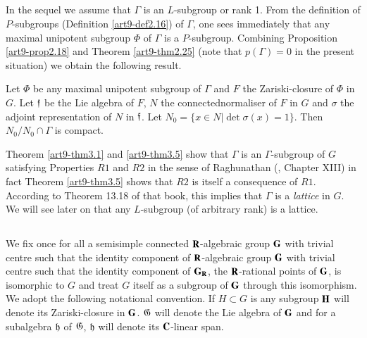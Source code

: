 \subsection{}\label{art9-subsec3.4}
In the sequel we assume that $\Gamma$ is an $L$-subgroup or rank 1. From the definition of $P$-subgroups (Definition \ref{art9-def2.16}) of $\Gamma$, one sees immediately that any maximal unipotent subgroup $\Phi$ of $\Gamma$ is a $P$-subgroup. Combining Proposition \ref{art9-prop2.18} and Theorem \ref{art9-thm2.25} (note that $p(\Gamma) = 0$ in the present situation) we obtain the following result.

\setcounter{definition}{4}
\begin{theorem}\label{art9-thm3.5}
Let $\Phi$ be any maximal unipotent subgroup of $\Gamma$ and $F$ the Zariski-closure of $\Phi$ in $G$. Let $\mathfrak{f}$ be the Lie algebra of $F$, $N$ the connected\pageoriginale normaliser of $F$ in $G$ and $\sigma$ the adjoint representation of $N$ in $\mathfrak{f}$. Let $N_0 = \{x \in N \big| \det \sigma (x) =1\}$. Then $N_0 / N_0 \cap \Gamma$ is compact.
\end{theorem}

\begin{remark}\label{art9-remark3.6}
Theorem \ref{art9-thm3.1} and \ref{art9-thm3.5} show that $\Gamma$ is an $\Gamma$-subgroup of $G$ satisfying Properties $R1$ and $R2$ in the sense of Raghunathan (\cite{art9-raghunathan-1}, Chapter XIII) in fact Theorem \ref{art9-thm3.5} shows that $R2$ is itself a consequence of $R1$. According to Theorem 13.18 of that book, this implies that $\Gamma$ is a \textit{lattice} in $G$. We will see later on that any $L$-subgroup (of arbitrary rank) is a lattice.
\end{remark}

\setcounter{subsection}{6}
\subsection{}\label{art9-subsec3.7}
We fix once for all a semisimple connected $\mathbf{R}$-algebraic group $\mathbf{G}$ with trivial centre such that the identity component of $\mathbf{R}$-algebraic group $\mathbf{G}$ with trivial centre such that the identity component of $\mathbf{G}_{\mathbf{R}}$, the $\mathbf{R}$-rational points of $\mathbf{G}$, is isomorphic to $G$ and treat $G$ itself as a subgroup of $\mathbf{G}$ through this isomorphism. We adopt the following notational convention. If $H \subset G$ is any subgroup $\mathbf{H}$ will denote its Zariski-closure in $\mathbf{G}$. $\mathfrak{G}$ will denote the Lie algebra of $\mathbf{G}$ and for a subalgebra $\mathfrak{h}$ of $\mathfrak{G}$, $\mathfrak{h}$ will denote its $\mathbf{C}$-linear span.

